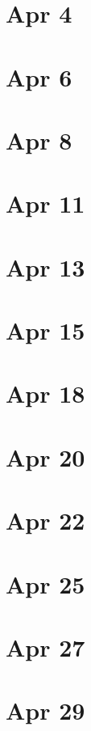 \documentclass{article}
\newcommand{\<}{\langle}
\renewcommand{\>}{\rangle}
\numberwithin{equation}{section}
\theoremstyle{plain}
\theoremstyle{definition}
\theoremstyle{remark}
\begin{document}
\section*{Apr 4}

\section*{Apr 6}

\section*{Apr 8}

\section*{Apr 11}

\section*{Apr 13}

\section*{Apr 15}

\section*{Apr 18}

\section*{Apr 20}

\section*{Apr 22}

\section*{Apr 25}

\section*{Apr 27}

\section*{Apr 29}
\end{document}
